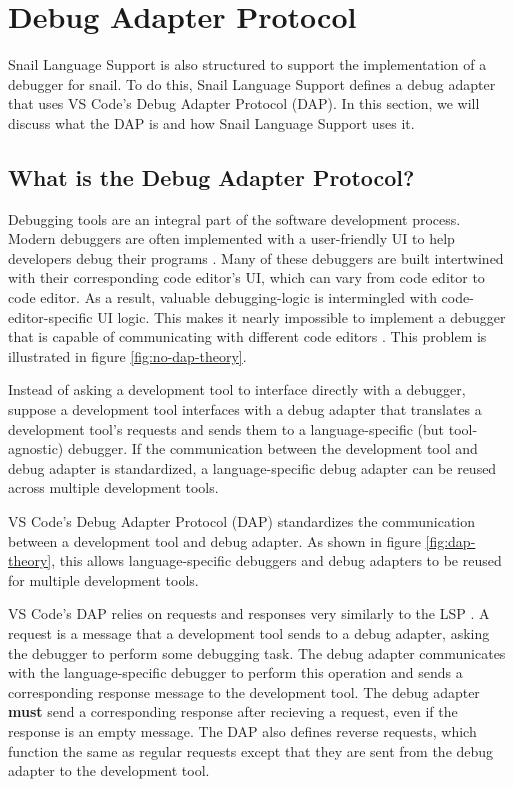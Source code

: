 \documentclass{article}
\begin{document}
\section{Debug Adapter Protocol}

Snail Language Support is also structured to support the implementation of a debugger for snail. To do this, Snail Language Support defines a debug adapter that uses VS Code's Debug Adapter Protocol (DAP). In this section, we will discuss what the DAP is and how Snail Language Support uses it.

\subsection{What is the Debug Adapter Protocol?}

Debugging tools are an integral part of the software development process. Modern debuggers are often implemented with a user-friendly UI to help developers debug their programs \cite{Microsoft_2022b,Matloff_Salzman_2008,Sinha_2017}. Many of these debuggers are built intertwined with their corresponding code editor's UI, which can vary from code editor to code editor. As a result, valuable debugging-logic is intermingled with code-editor-specific UI logic. This makes it nearly impossible to implement a debugger that is capable of communicating with different code editors \cite{Microsoft_2021a}. This problem is illustrated in figure \ref{fig:no-dap-theory}.

Instead of asking a development tool to interface directly with a debugger, suppose a development tool interfaces with a debug adapter that translates a development tool's requests and sends them to a language-specific (but tool-agnostic) debugger. If the communication between the development tool and debug adapter is standardized, a language-specific debug adapter can be reused across multiple development tools. 

VS Code's Debug Adapter Protocol (DAP) standardizes the communication between a development tool and debug adapter. As shown in figure \ref{fig:dap-theory}, this allows language-specific debuggers and debug adapters to be reused for multiple development tools.

VS Code's DAP relies on requests and responses very similarly to the LSP \cite{Microsoft_2021b}. A request is a message that a development tool sends to a debug adapter, asking the debugger to perform some debugging task. The debug adapter communicates with the language-specific debugger to perform this operation and sends a corresponding response message to the development tool. The debug adapter \textbf{must} send a corresponding response after recieving a request, even if the response is an empty message. The DAP also defines reverse requests, which function the same as regular requests except that they are sent from the debug adapter to the development tool.
\end{document}
